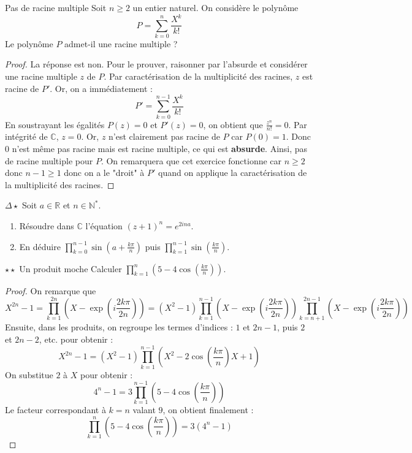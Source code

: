 \documentclass[french,a4paper]{article}
\newcommand{\N}{\mathbb{N}}
\newcommand{\R}{\mathbb{R}}
\newcommand{\C}{\mathbb{C}}
\newcommand{\st}{^*}
\theoremstyle{plain}
\theoremstyle{definition}
\theoremstyle{remark}
\begin{document}
\begin{ex}[Morlot]{Pas de racine multiple}
	Soit $n \ge 2$ un entier naturel. On considère le polynôme $$P = \sum_{k=0}^{n}\frac{X^k}{k!}$$ Le polynôme $P$ admet-il une racine multiple ?
\end{ex}
\begin{proof}
	La réponse est non. Pour le prouver, raisonner par l'absurde et considérer une racine multiple $z$ de $P$. Par caractérisation de la multiplicité des racines, $z$ est racine de $P'$. Or, on a immédiatement : $$P'=\sum_{k=0}^{n-1}\frac{X^k}{k!}$$ En soustrayant les égalités $P(z)=0$ et $P'(z)=0$, on obtient que $\displaystyle \frac{z^n}{n!}=0$. Par intégrité de $\C$, $z=0$. Or, $z$ n'est clairement pas racine de $P$ car $P(0)=1$. Donc 0 n'est même pas racine mais est racine multiple, ce qui est \textbf{absurde}. Ainsi, pas de racine multiple pour $P$. On remarquera que cet exercice fonctionne car $n \ge 2$ donc $n-1 \ge 1$ donc on a le "droit" à $P'$ quand on applique la caractérisation de la multiplicité des racines.
\end{proof}

\begin{ex}{$\Delta\star$}
	Soit $a\in\R$ et $n\in\N\st$.
	\begin{enumerate}
		\item Résoudre dans $\C$ l'équation $(z+1)^n=e^{2ina}$.
		\item En déduire $\displaystyle\prod_{k=0}^{n-1}\sin\left(a+\frac{k\pi}{n}\right)$ puis $\displaystyle\prod_{k=1}^{n-1}\sin\left(\frac{k\pi}{n}\right)$.
	\end{enumerate}
\end{ex}

\begin{ex}{$\star\star$ Un produit moche}
	Calculer $\displaystyle\prod_{k=1}^{n}\left(5-4\cos\left(\frac{k\pi}{n}\right)\right)$.
\end{ex}
\begin{proof}
	On remarque que $$X^{2n}-1=\prod_{k=1}^{2n}\left(X-\exp\left(i\frac{2k\pi}{2n}\right)\right)=(X^2-1)\prod_{k=1}^{n-1}\left(X-\exp\left(i\frac{2k\pi}{2n}\right)\right)\prod_{k=n+1}^{2n-1}\left(X-\exp\left(i\frac{2k\pi}{2n}\right)\right)$$ Ensuite, dans les produits, on regroupe les termes d'indices : $1$ et $2n-1$, puis $2$ et $2n-2$, etc. pour obtenir : $$X^{2n}-1=(X^2-1)\prod_{k=1}^{n-1}\left(X^2-2\cos\left(\frac{k\pi}{n}\right)X+1\right)$$ On substitue $2$ à $X$ pour obtenir : $$4^n-1=3\prod_{k=1}^{n-1}\left(5-4\cos\left(\frac{k\pi}{n}\right)\right)$$ Le facteur correspondant à $k=n$ valant $9$, on obtient finalement : $$\prod_{k=1}^{n}\left(5-4\cos\left(\frac{k\pi}{n}\right)\right)=3(4^n-1)$$
\end{proof}
\end{document}
